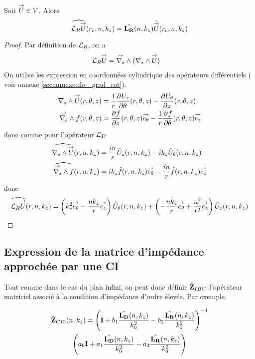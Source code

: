     \begin{prop}
      Soit \(\vect{U} \in V\).
      Alors
      \begin{equation*}
        \widehat{\LR \vect{U}} (r_c,n,k_z) = \hat{\mLR}(n,k_z) \hat{\vect{U}}(r_c,n,k_z)
      \end{equation*}
    \end{prop}

    \begin{proof}
      Par définition de \(\LR\), on a
      \begin{align*}
        \LR \vect{U} & = \vrots{} (\rots{} \vect{U})
      \end{align*}
      On utilise les expression en coordonnées cylindrique des opérateurs différentiels ( voir annexe \ref{sec:annexe:div_grad_rot}).
      \begin{align*}
        \rots{\vect{U}}(r,\theta,z) &= \frac{1}{r}\ddr{\theta}{U_z}(r,\theta,z) - \ddr{z}{U_\theta}(r,\theta,z)
        \\
        \vrots{f}(r,\theta,z) &= \ddr{z}{f}(r,\theta,z)\vect{e_\theta} - \frac{1}{r}\ddr{\theta}{f}(r,\theta,z)\vect{e_z}
      \end{align*}
      donc comme pour l'opérateur \(\LD\)
      \begin{align*}
        \widehat{\rots{\vect{U}}}(r,n,k_z) &= \frac{in}{r}{\hat{U}_z}(r,n,k_z) - ik_z{\hat{U}_\theta}(r,n,k_z)
        \\
        \widehat{\vrots{f}}(r,n,k_z) &=  ik_z\hat{f}(r,n,k_z)\vect{e_\theta} - \frac{in}{r}\hat{f}(r,n,k_z)\vect{e_z}
      \end{align*}
      donc
      \begin{align*}
        \widehat{\LR{\vect{U}}}(r,n,k_z) =  \left({k_z^2}\vect{e_\theta} - \frac{nk_z}{r}\vect{e_z}\right){\hat{U}_\theta}(r,n,k_z) + \left(-\frac{nk_z}{r}\vect{e_\theta} + \frac{n^2}{r^2}\vect{e_z}\right){\hat{U}_z}(r,n,k_z)
      \end{align*}

    \end{proof}

  \subsection{Expression de la matrice d'impédance approchée par une CI}

    Tout comme dans le cas du plan infini, on peut donc définir \(\hat{\mZ}_{IBC}\) l’opérateur matriciel associé à la condition d'impédance d'ordre élevée. Par exemple,

    \begin{multline}
      \label{eq:cylindre:hoibc:ci3}
      \hat{\mZ}_{CI3}(n,k_z) = \left(\mI + b_1 \frac{\hat{\mLD}(n,k_z)}{k_0^2} - b_2 \frac{\hat{\mLR}(n,k_z)}{k_0^2} \right)^{-1}\\\left(a_0 \mI + a_1 \frac{\hat{\mLD}(n,k_z)}{k_0^2} - a_2 \frac{\hat{\mLR}(n,k_z)}{k_0^2}\right)
    \end{multline}

